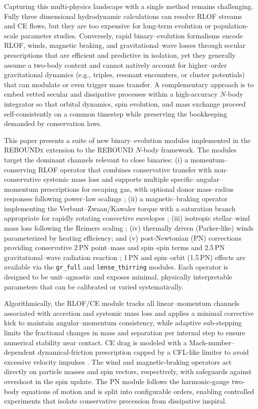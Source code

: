 \documentclass[11pt]{article}
\begin{document}
Capturing this multi-physics landscape with a single method remains challenging. Fully three dimensional hydrodynamic calculations can resolve RLOF streams and CE flows, but they are too expensive for long-term evolution or population-scale parameter studies. Conversely, rapid binary–evolution formalisms encode RLOF, winds, magnetic braking, and gravitational–wave losses through secular prescriptions that are efficient and predictive in isolation, yet they generally assume a two-body context and cannot natively account for higher–order gravitational dynamics (e.g., triples, resonant encounters, or cluster potentials) that can modulate or even trigger mass transfer. A complementary approach is to embed vetted secular and dissipative processes within a high-accuracy $N$-body integrator so that orbital dynamics, spin evolution, and mass exchange proceed self-consistently on a common timestep while preserving the bookkeeping demanded by conservation laws.

This paper presents a suite of new binary–evolution modules implemented in the \textsc{REBOUNDx} extension to the \textsc{REBOUND} $N$-body framework. The modules target the dominant channels relevant to close binaries: (i) a momentum–conserving RLOF operator that combines conservative transfer with non-conservative systemic mass loss and supports multiple specific–angular–momentum prescriptions for escaping gas, with optional donor mass–radius responses following power–law scalings \citep{Eggleton1983,Ritter1988,Hurley2000}; (ii) a magnetic–braking operator implementing the Verbunt–Zwaan/Kawaler torque with a saturation branch appropriate for rapidly rotating convective envelopes \citep{Verbunt1981,Kawaler1988}; (iii) isotropic stellar–wind mass loss following the Reimers scaling \citep{Reimers1975}; (iv) thermally driven (Parker-like) winds parameterized by heating efficiency; and (v) post-Newtonian (PN) corrections providing conservative 2\,PN point–mass and spin–spin terms and 2.5\,PN gravitational–wave radiation reaction \citep{Einstein1915,Peters1964,Kidder1995}; 1\,PN and spin--orbit (1.5\,PN) effects are available via the \texttt{gr\_full} and \texttt{lense\_thirring} modules. Each operator is designed to be unit–agnostic and exposes minimal, physically interpretable parameters that can be calibrated or varied systematically.

Algorithmically, the RLOF/CE module tracks all linear–momentum channels associated with accretion and systemic mass loss and applies a minimal corrective kick to maintain angular–momentum consistency, while adaptive sub-stepping limits the fractional changes in mass and separation per internal step to ensure numerical stability near contact. CE drag is modeled with a Mach-number–dependent dynamical-friction prescription capped by a CFL-like limiter to avoid excessive velocity impulses \citep{Ostriker1999}. The wind and magnetic-braking operators act directly on particle masses and spin vectors, respectively, with safeguards against overshoot in the spin update. The PN module follows the harmonic-gauge two-body equations of motion \citep{Kidder1995} and is split into configurable orders, enabling controlled experiments that isolate conservative precession from dissipative inspiral.
\end{document}
